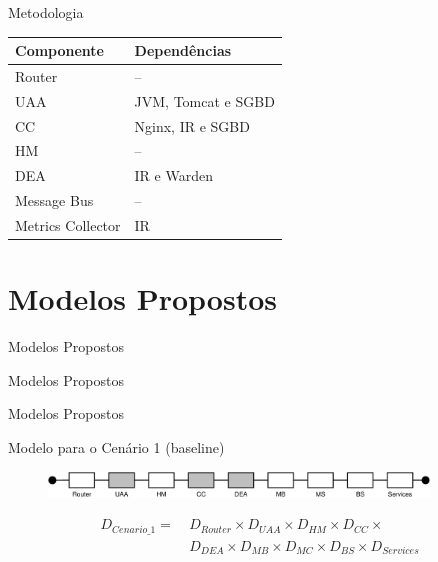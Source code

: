 \documentclass{beamer}
\begin{document}
    \begin{frame}{Metodologia}
    
        \begin{table}[h]
            \centering
            \begin{tabular}{@{}ll@{}}
            \toprule
            Componente        & Dependências        \\ \midrule
            Router            & --                 \\
            UAA               & JVM, Tomcat e SGBD \\
            CC                & Nginx, IR e SGBD   \\
            HM                & --                 \\
            DEA               & IR e Warden        \\
            Message Bus       & --                 \\
            Metrics Collector & IR                 \\ \bottomrule
            \end{tabular}
        \end{table}
    
    \end{frame}


\section{Modelos Propostos}

    \begin{frame}{Modelos Propostos}
        \Huge{\centerline{Modelos Propostos}}
    \end{frame}
    
    \begin{frame}{Modelos Propostos}
    
        Modelo para o Cenário 1 (baseline)
        
        \begin{figure}[ht]
            \includegraphics[width=0.9\textwidth]{img/model1}
        \end{figure}
        
        \begin{align*}
            D_{Cenario\_1} =~ & D_{Router} \times D_{UAA} \times D_{HM} \times D_{CC} \times\\
                            & D_{DEA}  \times  D_{MB} \times D_{MC} \times D_{BS}  \times D_{Services}
        \end{align*}

    \end{frame}
    
\end{document}
